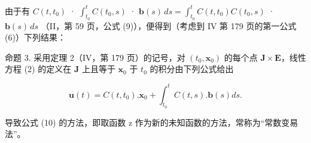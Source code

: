由于有 \(C(t, t_{0})\) · \(\int_{t_{0}}^{t} C(t_{0}, s)\) · \(\mathbf{b}(s) \, ds = \int_{t_{0}}^{t} C(t, t_{0}) C(t_{0}, s)\) · \(\mathbf{b}(s) \, ds\) （II，第 59 页，公式 (9)），便得到（考虑到 IV 第 179 页的第一公式 (6)）下列结果：

命题 3. 采用定理 2（IV，第 179 页）的记号，对 \((t_0, \mathbf{x}_0)\) 的每个点 \(\mathbf{J} \times \mathbf{E}\)，线性方程 (2) 的定义在 \(\mathbf{J}\) 上且等于 \(\mathbf{x}_0\) 于 \(t_0\) 的积分由下列公式给出

\[
\mathbf {u} (t) = C (t, t _ {0}). \mathbf {x} _ {0} + \int_ {t _ {0}} ^ {t} C (t, s). \mathbf {b} (s) d s.\tag{10}
\]

导致公式 (10) 的方法，即取函数 z 作为新的未知函数的方法，常称为“常数变易法”。
